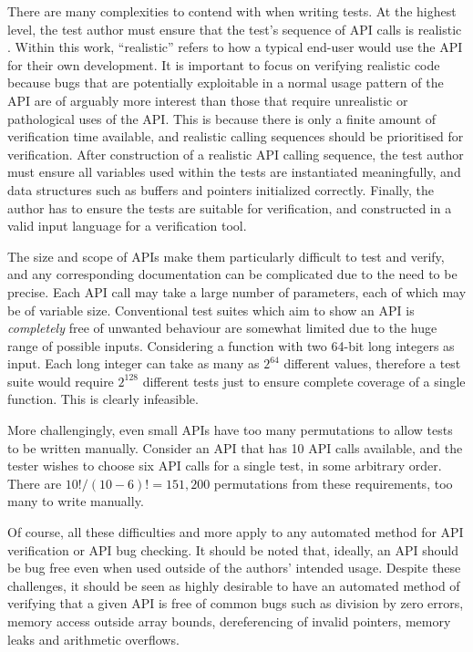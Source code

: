 \documentclass[EPiC]{easychair}
\begin{document}
   
There are many complexities to contend with when writing tests.   At the highest level, the test author must ensure that the test's sequence of API calls is realistic \cite{ApiTestingPickingStrategy}.  Within this work, \enquote{realistic} refers to how a typical end-user would use the API for their own development.  It is important to focus on verifying realistic code because bugs that are potentially exploitable in a normal usage pattern of the API are of arguably more interest than those that require unrealistic or pathological uses of the API.  This is because there is only a finite amount of verification time available, and realistic calling sequences should be prioritised for verification.
After construction of a realistic API calling sequence, the test author must ensure all variables used within the tests are instantiated meaningfully, and data structures such as buffers and pointers initialized correctly.  
Finally, the author has to ensure the tests are suitable for verification, and constructed in a valid input language for a verification tool. 

The size and scope of APIs make them particularly difficult to test and verify, and any corresponding documentation can be complicated due to the need to be precise.  Each API call may take a large number of parameters, each of which may be of variable size.  Conventional test suites which aim to show an API is \textit{completely} free of unwanted behaviour are somewhat limited due to the huge range of possible inputs. 
Considering a function with two 64-bit long integers as input.  Each long integer can take as many as $2^{64}$ different values, therefore a test suite would require $2^{128}$ different tests just to ensure complete coverage of a single function.  This is clearly infeasible.

More challengingly, even small APIs have too many permutations to allow tests to be written manually.  Consider an API that has 10 API calls available, and the tester wishes to choose six API calls for a single test, in some arbitrary order.  There are  $10!/(10-6)!=151,200$ permutations from these requirements, too many to write manually.  


Of course, all these difficulties and more apply to any automated method for API verification or API bug checking.  It should be noted that, ideally, an API should be bug free even when used outside of the authors' intended usage.  Despite these challenges, it should be seen as highly desirable to have an automated method of verifying that a given API is free of common bugs such as division by zero errors, memory access outside array bounds, dereferencing of invalid pointers, memory leaks and arithmetic overflows.
\end{document}
